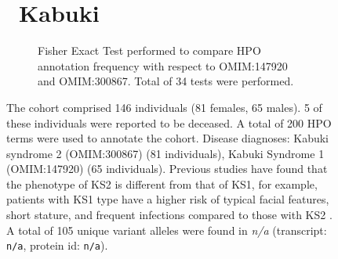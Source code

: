 \begin{figure}[htbp]
\section*{ Kabuki}
\centering
\begin{subfigure}[b]{0.95\textwidth}
\centering
{}
\captionsetup{justification=raggedright,singlelinecheck=false}
\caption{Fisher Exact Test performed to compare HPO annotation frequency with respect to OMIM:147920 and OMIM:300867. Total of
        34 tests were performed. }
\end{subfigure}
\vspace{2em}
\caption{ The cohort comprised 146 individuals (81 females, 65 males). 5 of these individuals were reported to be deceased. 
A total of 200 HPO terms were used to annotate the cohort. Disease diagnoses: Kabuki syndrome 2 (OMIM:300867) (81 individuals), Kabuki Syndrome 1 (OMIM:147920) (65 individuals). 
Previous studies have found that the phenotype of KS2 is different from that of KS1, for example, patients with KS1 type have a higher risk of typical facial features, short stature, 
and frequent infections compared to those with KS2 \cite{PMID_30514738,PMID_23320472,PMID_38373926}.
A total of 105 unique variant alleles were found in \textit{n/a} (transcript: \texttt{n/a}, protein id: \texttt{n/a}).}
\end{figure}
